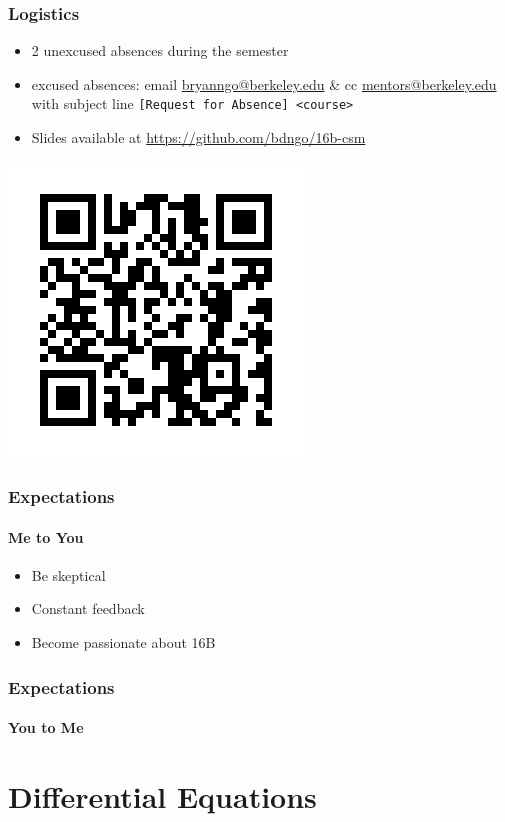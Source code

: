 \documentclass[aspectratio=169]{beamer}
\begin{document}
\begin{frame}
    \frametitle{Logistics}

    \begin{itemize}
        \item 2 unexcused absences during the semester
        \item excused absences: email \href{mailto:bryanngo@berkeley.edu}{bryanngo@berkeley.edu} \& cc \href{mailto:mentors@berkeley.edu}{mentors@berkeley.edu} with subject line \texttt{[Request for Absence] <course>}
        \item Slides available at \url{https://github.com/bdngo/16b-csm}
    \end{itemize}

    \includegraphics[width=0.7\textheight]{qr-code.png}
\end{frame}

\begin{frame}
    \frametitle{Expectations}
    \framesubtitle{Me to You}

    \begin{itemize}
        \item Be skeptical
        \item Constant feedback
        \item Become passionate about 16B
    \end{itemize}
\end{frame}

\begin{frame}
    \frametitle{Expectations}
    \framesubtitle{You to Me}

\end{frame}

\section{Differential Equations}
\end{document}
